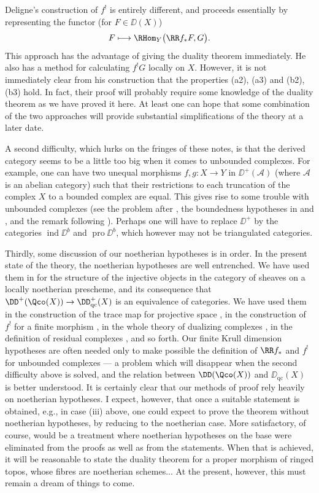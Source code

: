 Deligne's construction of $f^{!}$ is entirely different, and proceeds essentially by representing the functor (for $F\in \DD(X)$)
\[
F\longmapsto \RHom_{Y}\bigl(\RR f_{*}F,G\bigr).
\]
This approach has the advantage of giving the duality theorem immediately. He also has a method for calculating $f^{!}G$ locally on $X$. However, it is not immediately clear from his construction that the properties (a2), (a3) and (b2), (b3) hold. In fact, their proof will probably require some knowledge of the duality theorem as we have proved it here. At least one can hope that some combination of the two approaches will provide substantial simplifications of the theory at a later date.

A second difficulty, which lurks on the fringes of these notes, is that the derived category seems to be a little too big when it comes to unbounded complexes. For example, one can have two unequal morphisms $f,g\colon X\to Y$ in $\DD^{+}(\mathcal{A})$ (where $\mathcal{A}$ is an abelian category) such that their restrictions to each truncation of the complex $X$ to a bounded complex are equal. This gives rise to some trouble with unbounded complexes (see the problem after , the boundedness hypotheses in  and , and the remark following ). Perhaps one will have to replace $\DD^{+}$ by the categories $\operatorname{ind}\DD^{b}$ and $\operatorname{pro}\DD^{b}$, which however may not be triangulated categories.

Thirdly, some discussion of our noetherian hypotheses is in order. In the present state of the theory, the noetherian hypotheses are well entrenched. We have used them in  for the structure of the injective objects in the category of sheaves on a locally noetherian prescheme, and its consequence that $\DD^{+}(\Qco(X))\to \DD_{\mathrm{qc}}^{+}(X)$ is an equivalence of categories. We have used them in the construction of the trace map for projective space , in the construction of $f^{!}$ for a finite morphism , in the whole theory of dualizing complexes , in the definition of residual complexes , and so forth. Our finite Krull dimension hypotheses are often needed only to make possible the definition of $\RR f_{*}$ and $f^{!}$ for unbounded complexes --- a problem which will disappear when the second difficulty above is solved, and the relation between $\DD(\Qco(X))$ and $\DD_{\mathrm{qc}}(X)$ is better understood. It is certainly clear that our methods of proof rely heavily on noetherian hypotheses. I expect, however, that once a suitable statement is obtained, e.g., in case (iii) above, one could expect to prove the theorem without noetherian hypotheses, by reducing to the noetherian case. More satisfactory, of course, would be a treatment where noetherian hypotheses on the base were eliminated from the proofs as well as from the statements. When that is achieved, it will be reasonable to state the duality theorem for a proper morphism of ringed topos, whose fibres are noetherian schemes... At the present, however, this must remain a dream of things to come.

